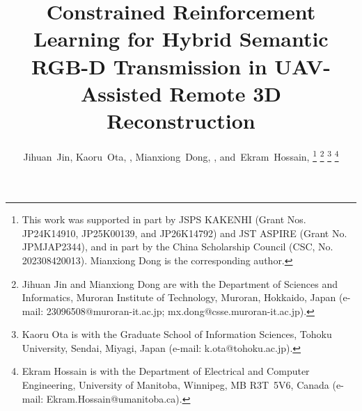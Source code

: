 \documentclass[journal]{IEEEtran}
\begin{document}
\title{Constrained Reinforcement Learning for Hybrid Semantic RGB-D Transmission in UAV-Assisted Remote 3D Reconstruction}

\author{Jihuan~Jin,
        Kaoru~Ota, ,
        Mianxiong~Dong, ,
        and~Ekram~Hossain, %
\thanks{This work was supported in part by JSPS KAKENHI (Grant Nos. JP24K14910, JP25K00139, and JP26K14792) and JST ASPIRE (Grant No. JPMJAP2344), and in part by the China Scholarship Council (CSC, No. 202308420013). Mianxiong Dong is the corresponding author.}%
\thanks{Jihuan Jin and Mianxiong Dong are with the Department of Sciences and Informatics, Muroran Institute of Technology, Muroran, Hokkaido, Japan (e-mail: 23096508@muroran-it.ac.jp; mx.dong@csse.muroran-it.ac.jp).}%
\thanks{Kaoru Ota is with the Graduate School of Information Sciences, Tohoku University, Sendai, Miyagi, Japan (e-mail: k.ota@tohoku.ac.jp).}%
\thanks{Ekram Hossain is with the Department of Electrical and Computer Engineering, University of Manitoba, Winnipeg, MB R3T~5V6, Canada (e-mail: Ekram.Hossain@umanitoba.ca).}%
}
\maketitle
\end{document}
